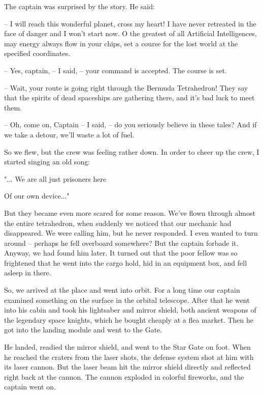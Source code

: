 \documentclass[ebook,twoside,final,openright]{memoir}
\begin{document}
\par
The captain was surprised by the story. He said:\par
– I will reach this wonderful planet, cross my heart! I have never retreated in the face of danger and I won’t start now. O the greatest of all Artificial Intelligences, may energy always flow in your chips, set a course for the lost world at the specified coordinates.\par
– Yes, captain, – I said, – your command is accepted. The course is set.\par
– Wait, your route is going right through the Bermuda Tetrahedron! They say that the spirits of dead spaceships are gathering there, and it’s bad luck to meet them.\par
– Oh, come on, Captain – I said, – do you seriously believe in these tales? And if we take a detour, we’ll waste a lot of fuel.\par
\par
So we flew, but the crew was feeling rather down. In order to cheer up the crew, I started singing an old song: \par
 "... We are all just prisoners here \par
 Of our own device..." \par
 But they became even more scared for some reason. We’ve flown through almost the entire tetrahedron, when suddenly we noticed that our mechanic had disappeared. We were calling him, but he never responded. I even wanted to turn around – perhaps he fell overboard somewhere? But the captain forbade it. Anyway, we had found him later. It turned out that the poor fellow was so frightened that he went into the cargo hold, hid in an equipment box, and fell asleep in there.\par
\par
So, we arrived at the place and went into orbit. For a long time our captain examined something on the surface in the orbital telescope. After that he went into his cabin and took his lightsaber and mirror shield, both ancient weapons of the legendary space knights, which he bought cheaply at a flea market. Then he got into the landing module and went to the Gate.\par
\par
He landed, readied the mirror shield, and went to the Star Gate on foot. When he reached the craters from the laser shots, the defense system shot at him with its laser cannon. But the laser beam hit the mirror shield directly and reflected right back at the cannon. The cannon exploded in colorful fireworks, and the captain went on.\par
\end{document}
